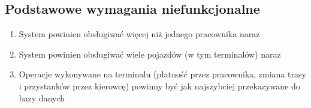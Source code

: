 \subsection{Podstawowe wymagania niefunkcjonalne}
\begin{enumerate}
  \item{System powinien obsługiwać więcej niż jednego pracownika naraz}
  \item{System powinien obsługiwać wiele pojazdów (w tym terminalów) naraz}
  \item{Operacje wykonywane na terminalu (płatność przez pracownika, zmiana trasy i przystanków przez kierowcę) powinny być jak najszybciej przekazywane do bazy danych}
\end{enumerate}
